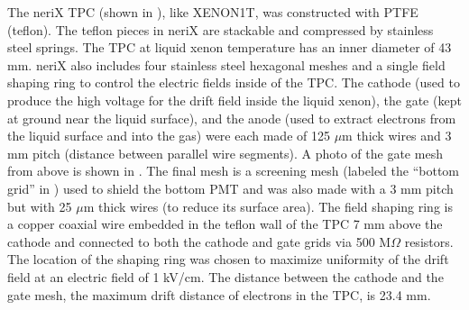 The neriX TPC (shown in ), like XENON1T, was constructed with PTFE (teflon).  The teflon pieces in neriX are stackable and compressed by stainless steel springs.  The TPC at liquid xenon temperature has an inner diameter of 43 mm.  neriX also includes four stainless steel hexagonal meshes and a single field shaping ring to control the electric fields inside of the TPC.  The cathode (used to produce the high voltage for the drift field inside the liquid xenon), the gate (kept at ground near the liquid surface), and the anode (used to extract electrons from the liquid surface and into the gas) were each made of  125 $\mu$m thick wires and 3 mm pitch (distance between parallel wire segments).  A photo of the gate mesh from above is shown in .  The final mesh is a screening mesh (labeled the ``bottom grid'' in ) used to shield the bottom PMT and was also made with a 3 mm pitch but with 25 $\mu$m thick wires (to reduce its surface area).  The field shaping ring is a copper coaxial wire embedded in the teflon wall of the TPC 7 mm above the cathode and connected to both the cathode and gate grids via 500 M$\Omega$ resistors.  The location of the shaping ring was chosen to maximize uniformity of the drift field at an electric field of 1 kV/cm.  The distance between the cathode and the gate mesh, the maximum drift distance of electrons in the TPC, is 23.4 mm.



